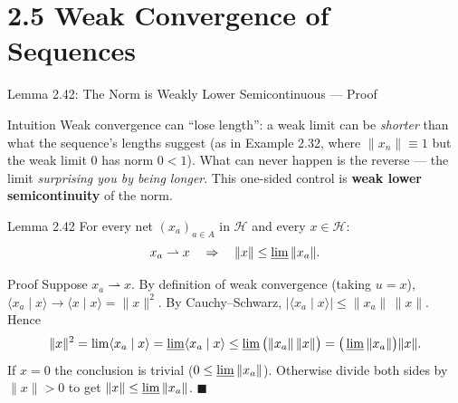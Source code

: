 \documentclass[aspectratio=169,10pt]{beamer}
\newcommand{\Hil}{\mathcal{H}}
\newcommand{\wto}{\rightharpoonup}
\newcommand{\ip}[2]{\langle #1 \mid #2 \rangle}
\begin{document}
\section{2.5 Weak Convergence of Sequences}

\begin{frame}{Lemma 2.42: The Norm is Weakly Lower Semicontinuous --- Proof}
  \begin{block}{Intuition}
    Weak convergence can ``lose length'': a weak limit can be
    \emph{shorter} than what the sequence's lengths suggest (as in Example
    2.32, where $\|x_n\|\equiv1$ but the weak limit $0$ has norm $0 < 1$).
    What can never happen is the reverse --- the limit \emph{surprising you
    by being longer}. This one-sided control is \textbf{weak lower
    semicontinuity} of the norm.
  \end{block}

  \begin{block}{Lemma 2.42}
    For every net $(x_a)_{a\in A}$ in $\Hil$ and every $x\in\Hil$:
    \[
      x_a\wto x \quad\Rightarrow\quad \|x\|\le\varliminf\|x_a\|.
    \]
  \end{block}

  \begin{block}{Proof}
    Suppose $x_a \wto x$. By definition of weak convergence (taking
    $u=x$), $\ip{x_a}{x}\to\ip{x}{x}=\|x\|^2$. By Cauchy--Schwarz,
    $|\ip{x_a}{x}|\le\|x_a\|\,\|x\|$. Hence
    \[
      \|x\|^2 = \lim \ip{x_a}{x} = \varliminf \ip{x_a}{x} \le \varliminf
      \big(\|x_a\|\,\|x\|\big) = \big(\varliminf\|x_a\|\big)\|x\|.
    \]
    If $x=0$ the conclusion is trivial ($0\le\varliminf\|x_a\|$). Otherwise
    divide both sides by $\|x\|>0$ to get $\|x\|\le\varliminf\|x_a\|$.
    $\blacksquare$
  \end{block}
\end{frame}
\end{document}
